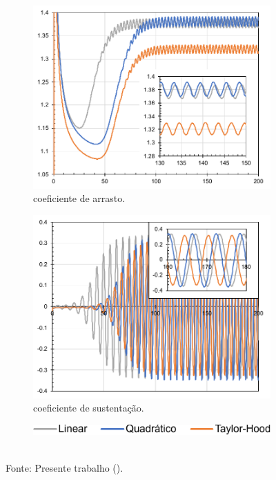 \begin{figure}[h!]
    \centering
    \caption{Valores ao longo do tempo na simulação sem modelo de:}
    \begin{subfigure}{.49\textwidth}
        \centering
        \includegraphics[width=\linewidth]{Figuras/cylinder/analise2/none-drag.pdf}
        \caption{coeficiente de arrasto.}
    \end{subfigure}
    \begin{subfigure}{.49\textwidth}
        \centering
        \includegraphics[width=\linewidth]{Figuras/cylinder/analise2/none-lift.pdf}
        \caption{coeficiente de sustentação.}
    \end{subfigure}
    \begin{subfigure}{\textwidth}
        \centering
        \includegraphics[width=.4\linewidth]{Figuras/cylinder/analise2/legenda.pdf}
    \end{subfigure}
    \\Fonte: Presente trabalho (\the\year).
    \label{fig:cyl-draglift-None}
\end{figure}

